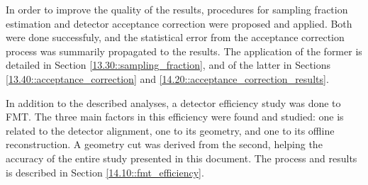     In order to improve the quality of the results, procedures for sampling fraction estimation and detector acceptance correction were proposed and applied.
    Both were done successfuly, and the statistical error from the acceptance correction process was summarily propagated to the results.
    The application of the former is detailed in Section \ref{13.30::sampling_fraction}, and of the latter in Sections \ref{13.40::acceptance_correction} and \ref{14.20::acceptance_correction_results}.

    In addition to the described analyses, a detector efficiency study was done to FMT.
    The three main factors in this efficiency were found and studied: one is related to the detector alignment, one to its geometry, and one to its offline reconstruction.
    A geometry cut was derived from the second, helping the accuracy of the entire study presented in this document.
    The process and results is described in Section \ref{14.10::fmt_efficiency}.

